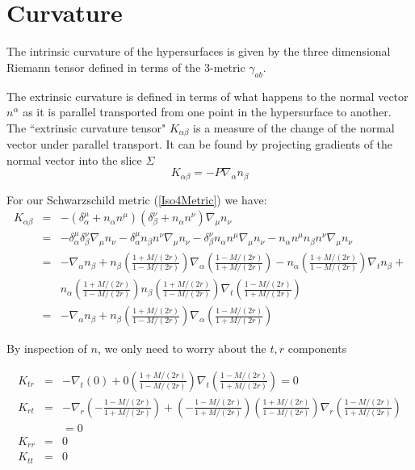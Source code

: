\documentclass{article}
\begin{document}
\section{Curvature}
The intrinsic curvature of the hypersurfaces is given by the three dimensional Riemann tensor defined in terms of the 3-metric $\gamma_{ab}$. 

The extrinsic curvature is defined in terms of what happens to the normal vector $n^\alpha$ as it is parallel transported from one point in the hypersurface to another. The ``extrinsic curvature tensor" $K_{\alpha \beta}$ is a measure of the change of the normal vector under parallel transport. It can be found by projecting gradients of the normal vector into the slice $\Sigma$ 
\[ K_{\alpha \beta} = -P\nabla_\alpha n_\beta \] 

For our Schwarzschild metric (\ref{Iso4Metric}) we have:
\begin{equation} \begin{array}{ccl}
K_{\alpha \beta} &=& -(\delta _\alpha ^\mu + n_\alpha n^\mu)(\delta ^\nu _\beta + n_\alpha n^\nu)\nabla_\mu n_\nu \\

 &=& -\delta _\alpha ^\mu \delta ^\nu _\beta \nabla_\mu n_\nu -
 	\delta_\alpha^\mu n_\beta n^\nu \nabla_\mu n_\nu-
 	\delta_\beta^\nu n_\alpha n^\mu \nabla_\mu n_\nu-
	 n_\alpha n^\mu n_\beta n^\nu \nabla_\mu n_\nu \\
 &=& -\nabla_\alpha n_\beta +
 	n_\beta \left(\frac{1+M/(2r)}{1-M/(2r)}\right)\nabla_\alpha \left(\frac{1-M/(2r)}{1+M/(2r)}\right)- 
 	n_\alpha \left(\frac{1+M/(2r)}{1-M/(2r)}\right)\nabla_t n_\beta +\\
 & &
 	n_\alpha \left(\frac{1+M/(2r)}{1-M/(2r)}\right)n_\beta \left(\frac{1+M/(2r)}{1-M/(2r)}\right) \nabla_t \left(\frac{1-M/(2r)}{1+M/(2r)}\right) \\
 &=& -\nabla_\alpha n_\beta +
 	n_\beta \left(\frac{1+M/(2r)}{1-M/(2r)}\right)\nabla_\alpha \left(\frac{1-M/(2r)}{1+M/(2r)}\right)
 \end{array}
\end{equation} 

By inspection of $n$, we only need to worry about the $t,r$ components

\begin{equation} \begin{array}{ccl}
K_{tr} &=& -\nabla_t (0) + 0 \left(\frac{1+M/(2r)}{1-M/(2r)}\right)\nabla_t \left(\frac{1-M/(2r)}{1+M/(2r)}\right) =0 \\
K_{rt} &=& -\nabla_r \left(-\frac{1-M/(2r)}{1+M/(2r)}\right) +\left(-\frac{1-M/(2r)}{1+M/(2r)}\right) \left(\frac{1+M/(2r)}{1-M/(2r)}\right)\nabla_r \left(\frac{1-M/(2r)}{1+M/(2r)}\right)\\ & & =0 \\
K_{rr} &=& 0 \\
K_{tt} &=& 0
\end{array}\end{equation}
\end{document}
